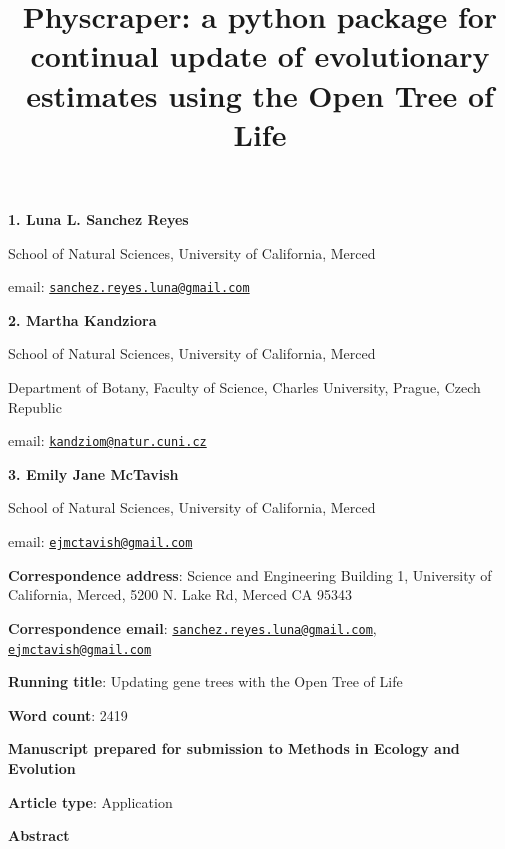 \documentclass[]{article}
\title{Physcraper: a python package for continual update of evolutionary estimates using the Open Tree of Life}
\author{}
\date{\vspace{-2.5em}}
\begin{document}
\maketitle

\textbf{1. Luna L. Sanchez Reyes}

School of Natural Sciences, University of California, Merced

email: \href{mailto:sanchez.reyes.luna@gmail.com}{\nolinkurl{sanchez.reyes.luna@gmail.com}}

\textbf{2. Martha Kandziora}

School of Natural Sciences, University of California, Merced

Department of Botany, Faculty of Science, Charles University, Prague, Czech Republic

email: \href{mailto:kandziom@natur.cuni.cz}{\nolinkurl{kandziom@natur.cuni.cz}}

\textbf{3. Emily Jane McTavish}

School of Natural Sciences, University of California, Merced

email: \href{mailto:ejmctavish@gmail.com}{\nolinkurl{ejmctavish@gmail.com}}

\textbf{Correspondence address}: Science and Engineering Building 1, University of California, Merced, 5200 N. Lake Rd, Merced CA 95343

\textbf{Correspondence email}: \href{mailto:sanchez.reyes.luna@gmail.com}{\nolinkurl{sanchez.reyes.luna@gmail.com}}, \href{mailto:ejmctavish@gmail.com}{\nolinkurl{ejmctavish@gmail.com}}

\textbf{Running title}: Updating gene trees with the Open Tree of Life

\textbf{Word count}: 2419

\textbf{Manuscript prepared for submission to Methods in Ecology and Evolution}

\textbf{Article type}: Application

\newpage

\begingroup\Large

\textbf{Abstract}
\endgroup
\end{document}
